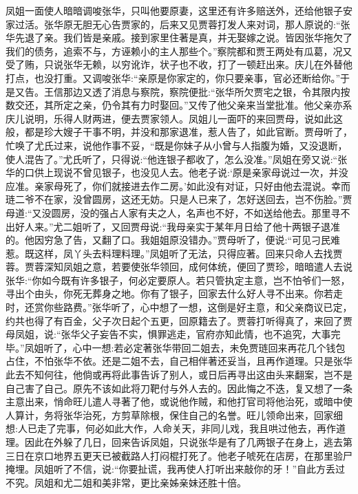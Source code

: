 \begin{parag}
    凤姐一面使人暗暗调唆张华，只叫他要原妻，这里还有许多赔送外，还给他银子安家过活。张华原无胆无心告贾家的，后来又见贾蓉打发人来对词，那人原说的:“张华先退了亲。我们皆是亲戚。接到家里住著是真，并无娶嫁之说。皆因张华拖欠了我们的债务，追索不与，方诬赖小的主人那些个。”察院都和贾王两处有瓜葛，况又受了贿，只说张华无赖，以穷讹诈，状子也不收，打了一顿赶出来。庆儿在外替他打点，也没打重。又调唆张华:“亲原是你家定的，你只要亲事，官必还断给你。”于是又告。王信那边又透了消息与察院，察院便批:“张华所欠贾宅之银，令其限内按数交还，其所定之亲，仍令其有力时娶回。”又传了他父亲来当堂批准。他父亲亦系庆儿说明，乐得人财两进，便去贾家领人。凤姐儿一面吓的来回贾母，说如此这般，都是珍大嫂子干事不明，并没和那家退准，惹人告了，如此官断。贾母听了，忙唤了尤氏过来，说他作事不妥，“既是你妹子从小曾与人指腹为婚，又没退断，使人混告了。”尤氏听了，只得说:“他连银子都收了，怎么没准。”凤姐在旁又说:“张华的口供上现说不曾见银子，也没见人去。他老子说:‘原是亲家母说过一次，并没应准。亲家母死了，你们就接进去作二房。’如此没有对证，只好由他去混说。幸而琏二爷不在家，没曾圆房，这还无妨。只是人已来了，怎好送回去，岂不伤脸。”贾母道:“又没圆房，没的强占人家有夫之人，名声也不好，不如送给他去。那里寻不出好人来。”尤二姐听了，又回贾母说:“我母亲实于某年月日给了他十两银子退准的。他因穷急了告，又翻了口。我姐姐原没错办。”贾母听了，便说:“可见刁民难惹。既这样，凤丫头去料理料理。”凤姐听了无法，只得应著。回来只命人去找贾蓉。贾蓉深知凤姐之意，若要使张华领回，成何体统，便回了贾珍，暗暗遣人去说张华:“你如今既有许多银子，何必定要原人。若只管执定主意，岂不怕爷们一怒，寻出个由头，你死无葬身之地。你有了银子，回家去什么好人寻不出来。你若走时，还赏你些路费。”张华听了，心中想了一想，这倒是好主意，和父亲商议已定，约共也得了有百金，父子次日起个五更，回原籍去了。贾蓉打听得真了，来回了贾母凤姐，说:“张华父子妄告不实，惧罪逃走，官府亦知此情，也不追究，大事完毕。”凤姐听了，心中一想:若必定著张华带回二姐去，未免贾琏回来再花几个钱包占住，不怕张华不依。还是二姐不去，自己相伴著还妥当，且再作道理。只是张华此去不知何往，他倘或再将此事告诉了别人，或日后再寻出这由头来翻案，岂不是自己害了自己。原先不该如此将刀靶付与外人去的。因此悔之不迭，复又想了一条主意出来，悄命旺儿遣人寻著了他，或说他作贼，和他打官司将他治死，或暗中使人算计，务将张华治死，方剪草除根，保住自己的名誉。旺儿领命出来，回家细想:人已走了完事，何必如此大作，人命关天，非同儿戏，我且哄过他去，再作道理。因此在外躲了几日，回来告诉凤姐，只说张华是有了几两银子在身上，逃去第三日在京口地界五更天已被截路人打闷棍打死了。他老子唬死在店房，在那里验尸掩埋。凤姐听了不信，说:“你要扯谎，我再使人打听出来敲你的牙！”自此方丢过不究。凤姐和尤二姐和美非常，更比亲姊亲妹还胜十倍。
\end{parag}


